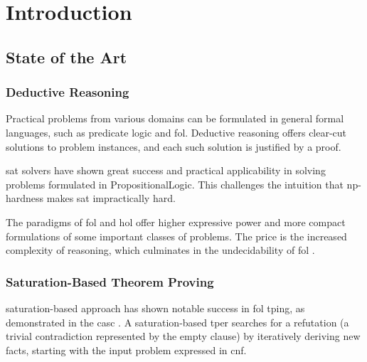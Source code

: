 

\chapter{Introduction}
\glsresetall

\section{State of the Art}
\label{sec:sota}

\subsection{Deductive Reasoning}

Practical problems from various domains can be formulated in general formal languages,
such as predicate logic and \gls{fol}.
Deductive reasoning offers clear-cut solutions to problem instances,
and each such solution is justified by a proof.

\Gls{sat} solvers have shown great success and practical applicability in solving problems formulated in \gls{PropositionalLogic}.
This challenges the intuition that \acrshort{np}-hardness makes \gls{sat} impractically hard.

The paradigms of \gls{fol} and \gls{hol} offer higher expressive power and more compact formulations of some important classes of problems.
The price is the increased complexity of reasoning,
which culminates in the undecidability of \gls{fol} \cite{}.


\subsection{Saturation-Based Theorem Proving}

\Gls{saturation}-based approach has shown notable success in \gls{fol} \gls{tping}, as demonstrated in the \gls{casc} \cite{Sut16}.
A \gls{saturation}-based \gls{tper} searches for a refutation
(a trivial contradiction represented by the empty clause)
by iteratively deriving new facts,
starting with the input problem expressed in \gls{cnf}.

